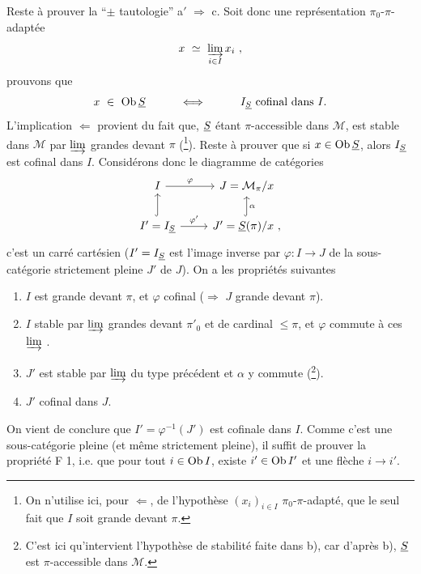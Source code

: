 Reste à prouver la “$\pm$ tautologie” a$'$ $\Longrightarrow$ c. Soit donc une représentation $\pi_0$-$\pi$-adaptée
\[
x \ \simeq \ \varinjlim_{i\in I} x_i \ ,
\]
prouvons que
\[
x \ \in \ \operatorname{Ob}\underline{S} \qquad\quad \Longleftrightarrow \qquad\quad I_{\underline{S}} \text{ cofinal dans } I.
\]
L'implication $\Longleftarrow$ provient du fait que, $\underline{S}$ étant $\pi$-accessible dans $\mathcal{M}$, est stable dans $\mathcal{M}$ par $\varinjlim$ grandes devant $\pi$ (\footnote[137]{On n'utilise ici, pour $\Longleftarrow$, de l'hypothèse $(x_i)_{i\in I}$ $\pi_0$-$\pi$-adapté, que le seul fait que $I$ soit grande devant $\pi$.}). Reste à prouver que si $x \in \operatorname{Ob}\underline{S}$, alors $I_{\underline{S}}$ est cofinal dans $I$. Considérons donc le diagramme de catégories
\[
\begin{tikzcd}
I \arrow[r, "\varphi"] & J = \mathcal{M}_\pi/x \\
I' = I_{\uS} \arrow[u, hook] \arrow[r, "\varphi'"] & J' = \uS(\pi)/x \ , \arrow[u, hook, "\alpha"']
\end{tikzcd}
\]
c'est un carré cartésien ($I' = I_{\underline{S}}$ est l'image inverse par $\varphi : I \longrightarrow J$ de la sous-catégorie strictement pleine $J'$ de $J$). On a les propriétés suivantes
\begin{enumerate}
\item[1)] $I$ est grande devant $\pi$, et $\varphi$ cofinal ($\Longrightarrow$ $J$ grande devant $\pi$).
\item[2)] $I$ stable par $\varinjlim$ grandes devant $\pi'_0$ et de cardinal $\leqslant \pi$, et $\varphi$ commute à ces $\varinjlim$ .
\item[3)] $J'$ est stable par $\varinjlim$ du type précédent et $\alpha$ y commute (\footnote[138]{C'est ici qu'intervient l'hypothèse de stabilité faite dans b), car d'après b), $\underline{S}$ est $\pi$-accessible dans $\mathcal{M}$.}).
\item[4)] $J'$ cofinal dans $J$.
\end{enumerate}
\noindent On vient de conclure que $I' = \varphi^{-1}(J')$ est cofinale dans $I$. Comme c'est une sous-catégorie pleine (et même strictement pleine), il suffit de prouver la propriété F 1, i.e. que pour tout $i \in \operatorname{Ob} I$, existe $i' \in \operatorname{Ob} I'$ et une flèche $i \longrightarrow i'$.

